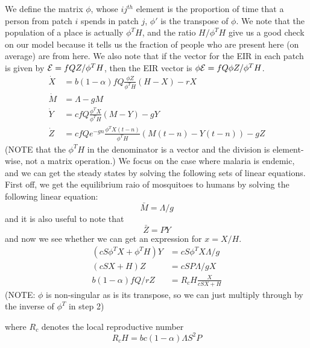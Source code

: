 \documentclass{article}
\begin{document}
We define the matrix $\phi$, whose $ij^{th}$ element is the proportion of time that a person from patch $i$ spends in patch $j$, $\phi'$ is the transpose of $\phi$.  We note that the population of a place is actually $\phi^T H$, and the ratio $H/\phi^T H$ give us a good check on our model because it tells us the fraction of people who are present here (on average) are from here. We also note that if the vector for the EIR in each patch is given by ${\cal E} = fQZ/\phi^T H$, then the EIR vector is $ \phi {\cal E} = fQ \phi Z/ \phi^T H$. 
%
\begin{equation}\begin{array}{rl}
\dot X &= b  (1-\alpha) f Q \frac{\textstyle{\phi Z}}{\textstyle{\phi^T H}} (H-X) - r X \\ 
\dot M &= \Lambda - g M \\ 
\dot Y &= c f Q \frac{\textstyle{\phi^T X}}{\textstyle{\phi^T H}}(M-Y) - g Y \\ 
\dot Z &= c f Q e^{-gn}\frac{\textstyle{\phi^T X(t-n)}}{\textstyle{\phi^T H}}(M(t-n)-Y(t-n)) - g Z
\end{array}\end{equation}
%
(NOTE that the $\phi^T H$ in the denominator is a vector and the division is element-wise, not a matrix operation.) 
We focus on the case where malaria is endemic, and we can get the steady states by solving the following sets of linear equations. First off, we get the equilibrium raio of mosquitoes to humans by solving the following linear equation: 
\begin{equation}
\bar M  = \Lambda/g 
\end{equation}
and it is also useful to note that
\begin{equation}
\bar Z  = P Y 
\end{equation}
%
and now we see whether we can get an expression for $x = X/H$.
\begin{equation} \begin{array}{rl}
\left( c S \phi^T X  + \phi^T H \right) Y &= c S \phi^T X  \Lambda/g \\
\left( c S X +  H \right) Z &= c S P \Lambda/g X \\ 
b (1-\alpha) f Q /r Z &= R_c H \frac{\textstyle{X}}{\textstyle{cSX + H}}
\end{array}
\end{equation}
(NOTE: $\phi$ is non-singular as is its transpose, so we can just multiply through by the inverse of $\phi^T$ in step 2) 

where $R_c$ denotes the local reproductive number 
\begin{equation}
R_c H = bc (1-\alpha) \Lambda S^2 P
\end{equation}
\end{document}
